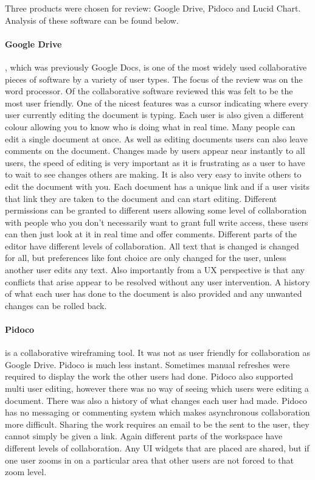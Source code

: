 Three products were chosen for review: Google Drive, Pidoco and Lucid Chart.  Analysis of these software can be found below.

\paragraph{Google Drive}, which was previously Google Docs, is one of the most widely used collaborative pieces of software by a variety of user types.  The focus of the review was on the word processor.  Of the collaborative software reviewed this was felt to be the most user friendly.  One of the nicest features was a cursor indicating where every user currently editing the document is typing. Each user is also given a different colour allowing you to know who is doing what in real time.  Many people can edit a single document at once.  As well as editing documents users can also leave comments on the document.  Changes made by users appear near instantly to all users, the speed of editing is very important as it is frustrating as a user to have to wait to see changes others are making.  It is also very easy to invite others to edit the document with you.  Each document has a unique link and if a user visits that link they are taken to the document and can start editing.  Different permissions can be granted to different users allowing some level of collaboration with people who you don't necessarily want to grant full write access, these users can then just look at it in real time and offer comments.  Different parts of the editor have different levels of collaboration.  All text that is changed is changed for all, but preferences like font choice are only changed for the user, unless another user edits any text.  Also importantly from a \ac{UX} perspective is that any conflicts that arise appear to be resolved without any user intervention.  A history of what each user has done to the document is also provided and any unwanted changes can be rolled back.

\paragraph{Pidoco} is a collaborative wireframing tool.  It was not as user friendly for collaboration as Google Drive.  Pidoco is much less instant.  Sometimes manual refreshes were required to display the work the other users had done.  Pidoco also supported multi user editing, however there was no way of seeing which users were editing a document. There was also a history of what changes each user had made.  Pidoco has no messaging or commenting system which makes asynchronous collaboration more difficult.  Sharing the work requires an email to be the sent to the user, they cannot simply be given a link.  Again different parts of the workspace have different levels of collaboration.  Any \ac{UI} widgets that are placed are shared, but if one user zooms in on a particular area that other users are not forced to that zoom level.

